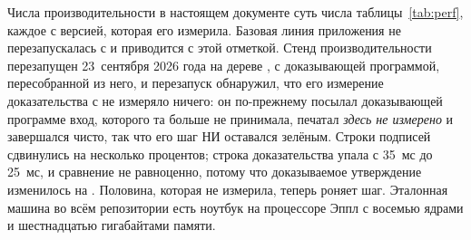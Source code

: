 Числа производительности в настоящем документе суть числа таблицы~\ref{tab:perf}, каждое с
версией, которая его измерила. Базовая линия приложения не перезапускалась с  и
приводится с этой отметкой. Стенд производительности перезапущен 23~сентября 2026 года на дереве
, с доказывающей программой, пересобранной из него, и перезапуск обнаружил, что его
измерение доказательства с  не измеряло ничего: он по-прежнему посылал доказывающей
программе вход, которого та больше не принимала, печатал \emph{здесь не измерено} и завершался
чисто, так что его шаг НИ оставался зелёным. Строки подписей сдвинулись на несколько процентов;
строка доказательства упала с 35~мс до 25~мс, и сравнение не равноценно, потому что доказываемое
утверждение изменилось на . Половина, которая не измерила, теперь роняет шаг. Эталонная машина во
всём репозитории есть ноутбук на процессоре Эппл с восемью ядрами и шестнадцатью гигабайтами
памяти.
